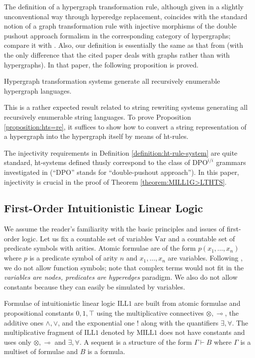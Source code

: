 \documentclass[a4paper,UKenglish,cleveref, autoref, thm-restate,pdfa]{lipics-v2021}
\newcommand{\Var}{\mathrm{Var}}
\newcommand{\mconj}{\otimes}
\newcommand{\limpl}{\multimap}
\newcommand{\aconj}{\wedge}
\newcommand{\adisj}{\vee}
\newcommand{\bang}{{!}}
\newcommand{\ILLFO}{\mathrm{ILL}1}
\newcommand{\MILLFO}{\mathrm{MILL}1}
\begin{document}
The definition of a hypergraph transformation rule, although given in a slightly unconventional way through hyperedge replacement, coincides with the standard notion of a graph transformation rule with injective morphisms of the double pushout approach formalism in the corresponding category of hypergraphs; compare it with \cite{Konig18}. Also, our definition is essentially the same as that from \cite{Uesu78} (with the only difference that the cited paper deals with graphs rather than with hypergraphs). In that paper, the following proposition is proved.
\begin{proposition}\label{proposition:hts=re}
	Hypergraph transformation systems generate all recursively enumerable hypergraph languages.
\end{proposition}
This is a rather expected result related to string rewriting systems generating all recursively enumerable string languages. To prove Proposition \ref{proposition:hts=re}, it suffices to show how to convert a string representation of a hypergraph into the hypergraph itself by means of ht-rules.

The injectivity requirements in Definition \ref{definition:ht-rule-system} are quite standard, ht-systems defined thusly correspond to the class of $\mathrm{DPO}^{i/i}$ grammars investigated in \cite{HabelMP01} (``DPO'' stands for ``double-pushout approach''). In this paper, injectivity is crucial in the proof of Theorem \ref{theorem:MILL1G>LTHTS}.


\subsection{First-Order Intuitionistic Linear Logic}\label{subsection:ILL1}

We assume the reader's familiarity with the basic principles and issues of first-order logic. Let us fix a countable set of variables $\Var$ and a countable set of predicate symbols with arities. Atomic formulae are of the form $p(x_1,\ldots,x_n)$ where $p$ is a predicate symbol of arity $n$ and $x_1,\ldots,x_n$ are variables. Following \cite{Komori86,Moot14,MootP01}, we do not allow function symbols; note that complex terms would not fit in the \emph{variables are nodes, predicates are hyperedges} paradigm. We also do not allow constants because they can easily be simulated by variables.

Formulae of intuitionistic linear logic $\ILLFO$ are built from atomic formulae and propositional constants $0,1,\top$ using the multiplicative connectives $\mconj,\limpl$, the additive ones $\aconj,\adisj$, and the exponential one $\bang$ along with the quantifiers $\exists,\forall$. The multiplicative fragment of $\ILLFO$ denoted by $\MILLFO$ does not have constants and uses only $\mconj,\limpl$ and $\exists,\forall$. A sequent is a structure of the form $\Gamma \vdash B$ where $\Gamma$ is a multiset of formulae and $B$ is a formula. 
\end{document}
